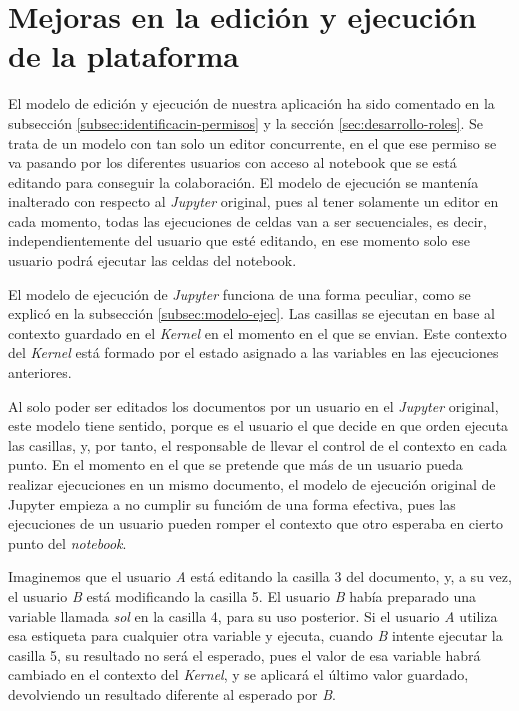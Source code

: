 \documentclass[11pt,spanish,listoffigures,listoftables]{tfgetsinf}
\begin{document}

\section{Mejoras en la edición y ejecución de la plataforma}
\label{sec:mejoras-ejec}

El modelo de edición y ejecución de nuestra aplicación ha sido comentado en la subsección \ref{subsec:identificacin-permisos} y la sección \ref{sec:desarrollo-roles}. Se trata de un modelo con tan solo un editor concurrente, en el que ese permiso se va pasando por los diferentes usuarios con acceso al notebook que se está editando para conseguir la colaboración. El modelo de ejecución se mantenía inalterado con respecto al \textit{Jupyter} original, pues al tener solamente un editor en cada momento, todas las ejecuciones de celdas van a ser secuenciales, es decir, independientemente del usuario que esté editando, en ese momento solo ese usuario podrá ejecutar las celdas del notebook.

El modelo de ejecución de \textit{Jupyter} funciona de una forma peculiar, como se explicó en la subsección \ref{subsec:modelo-ejec}. Las casillas se ejecutan en base al contexto guardado en el \textit{Kernel} en el momento en el que se envian. Este contexto del \textit{Kernel} está formado por el estado asignado a las variables en las ejecuciones anteriores. 

Al solo poder ser editados los documentos por un usuario en el \textit{Jupyter} original, este modelo tiene sentido, porque es el usuario el que decide en que orden ejecuta las casillas, y, por tanto, el  responsable de llevar el control de el contexto en cada punto. En el momento en el que se pretende que más de un usuario pueda realizar ejecuciones en un mismo documento, el modelo de ejecución original de Jupyter empieza a no cumplir su funcióm de una forma efectiva, pues las ejecuciones de un usuario pueden romper el contexto que otro esperaba en cierto punto del \textit{notebook}.

Imaginemos que el usuario \textit{A} está editando la casilla 3 del documento, y, a su vez, el usuario \textit{B} está modificando la casilla 5. El usuario \textit{B} había preparado una variable llamada \textit{sol} en la casilla 4, para su uso posterior. Si el usuario \textit{A} utiliza esa estiqueta para cualquier otra variable y ejecuta, cuando \textit{B} intente ejecutar la casilla 5, su resultado no será el esperado, pues el valor de esa variable habrá cambiado en el contexto del \textit{Kernel}, y se aplicará el último valor guardado, devolviendo un resultado diferente al esperado por \textit{B}.
\end{document}
